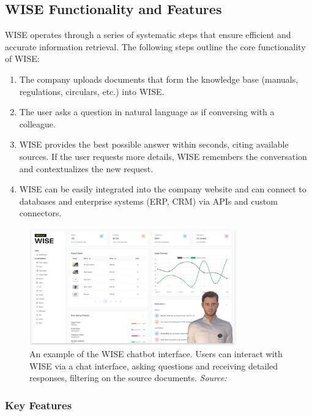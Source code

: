 \subsection{WISE Functionality and Features}

WISE operates through a series of systematic steps that ensure efficient and accurate information retrieval. The following steps outline the core functionality of WISE:

\begin{enumerate}
    \item The company uploads documents that form the knowledge base (manuals, regulations, circulars, etc.) into WISE.
    \item The user asks a question in natural language as if conversing with a colleague.
    \item WISE provides the best possible answer within seconds, citing available sources. If the user requests more details, WISE remembers the conversation and contextualizes the new request.
    \item WISE can be easily integrated into the company website and can connect to databases and enterprise systems (ERP, CRM) via APIs and custom connectors.
\end{enumerate}

\begin{figure}[h!]
    \centering
    \includegraphics[width=0.8\textwidth]{images/wise/wise-ux.png}
    \caption{An example of the WISE chatbot interface. Users can interact with WISE via a chat interface, asking questions and receiving detailed responses, filtering on the source  documents. \textit{Source:} \cite{hpa2024}}
    \label{fig:wise-chat-ux}
\end{figure}

\subsubsection{Key Features}

